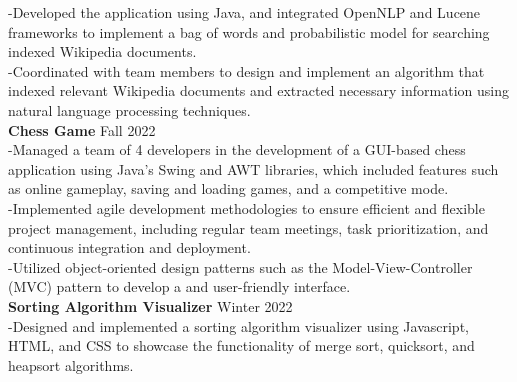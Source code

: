 \documentclass[10pt]{book}
\begin{document}
{        \hspace{2pt}-\hspace{6pt}Developed the application using Java, and integrated OpenNLP and Lucene 
        frameworks to implement a bag of words and probabilistic model for searching indexed Wikipedia documents.
        \\
        \hspace{2pt}-\hspace{6pt}Coordinated with team members to design and implement an algorithm that 
        indexed relevant Wikipedia documents and extracted necessary information using natural language processing techniques.
        \\
        {
            \noindent\fontsize{11}{11}
            \selectfont\hspace{-3pt}\textbf{Chess Game \textendash}\hfill Fall 2022
        }
        \\
        \hspace{2pt}-\hspace{6pt}Managed a team of 4 developers in the development of a GUI-based chess application 
        using Java's Swing and AWT libraries, which included features such as online gameplay, saving and loading games, 
        and a competitive mode.
        \\
        \hspace{2pt}-\hspace{6pt}Implemented agile development methodologies to ensure efficient and flexible project 
        management, including regular team meetings, task prioritization, and continuous integration and deployment.
        \\
        \hspace{2pt}-\hspace{6pt}Utilized object-oriented design patterns such as the Model-View-Controller (MVC) 
        pattern to develop a and user-friendly interface.
        \iffalse
        \\
        {
            \noindent\fontsize{11}{11}
            \selectfont\hspace{-3pt}\textbf{Sorting Algorithm Visualizer \textendash}\hfill Winter 2022
        }
        \\
        \hspace{2pt}-\hspace{6pt}Designed and implemented a sorting algorithm visualizer using Javascript, 
        HTML, and CSS to showcase the functionality of merge sort, quicksort, and heapsort algorithms.
}
\end{document}
